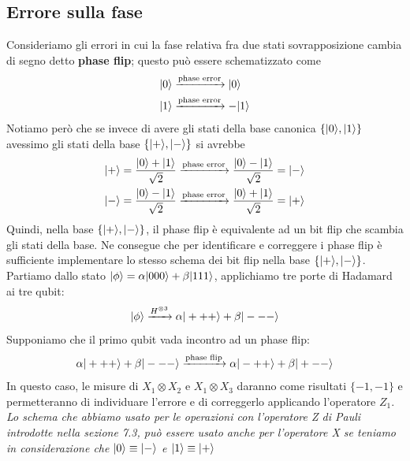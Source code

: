 \documentclass[12pt, a4paper]{report}
\begin{document}
\subsection{Errore sulla fase}
Consideriamo gli errori in cui la fase relativa fra due stati sovrapposizione cambia di segno detto \textbf{phase flip}; questo può essere schematizzato come
\begin{equation*}
    \begin{split}
        | 0 \rangle &\xrightarrow{\text{phase error}} | 0 \rangle \\
        | 1 \rangle &\xrightarrow{\text{phase error}} -| 1 \rangle
    \end{split}
\end{equation*}
Notiamo però che se invece di avere gli stati della base canonica $\{| 0 \rangle,| 1 \rangle\}$ avessimo gli stati della base $\{| + \rangle,| - \rangle\}$ si avrebbe
\begin{equation*}
    \begin{split}
        | + \rangle=\frac{| 0 \rangle+| 1 \rangle}{\sqrt{2}} &\xrightarrow{\text{phase error}}  \frac{| 0 \rangle-| 1 \rangle}{\sqrt{2}} = | - \rangle\\
        | - \rangle=\frac{| 0 \rangle-| 1 \rangle}{\sqrt{2}} &\xrightarrow{\text{phase error}} \frac{| 0 \rangle+| 1 \rangle}{\sqrt{2}} = | + \rangle
    \end{split}
\end{equation*}
Quindi, nella base $\{| + \rangle,| - \rangle\}$, il phase flip è equivalente ad un bit flip che scambia gli stati della base. Ne consegue che per identificare e correggere i phase flip è sufficiente implementare lo stesso schema dei bit flip nella base $\{| + \rangle,| - \rangle\}$.\\
Partiamo dallo stato $| \phi \rangle=\alpha| 000 \rangle+\beta| 111 \rangle$, applichiamo tre porte di Hadamard ai tre qubit:
\begin{equation*}
    | \phi \rangle\xrightarrow{H^{\otimes 3}}\alpha| +++ \rangle+\beta| --- \rangle
\end{equation*}
Supponiamo che il primo qubit vada incontro ad un phase flip:
\begin{equation*}
    \alpha| +++ \rangle+\beta| --- \rangle\xrightarrow{\text{phase flip}} \alpha| -++ \rangle+\beta| +-- \rangle
\end{equation*}
In questo caso, le misure di $X_{1}\otimes X_{2}$ e $X_{1}\otimes X_{3}$ daranno come risultati $\{-1,-1\}$ e permetteranno di individuare l'errore e di correggerlo applicando l'operatore $Z_{1}$.\\
\textit{Lo schema che abbiamo usato per le operazioni con l'operatore Z di Pauli introdotte nella sezione 7.3, può essere usato anche per l'operatore X se teniamo in considerazione che $| 0 \rangle\equiv | - \rangle$ e $| 1 \rangle\equiv | + \rangle$}
\end{document}
